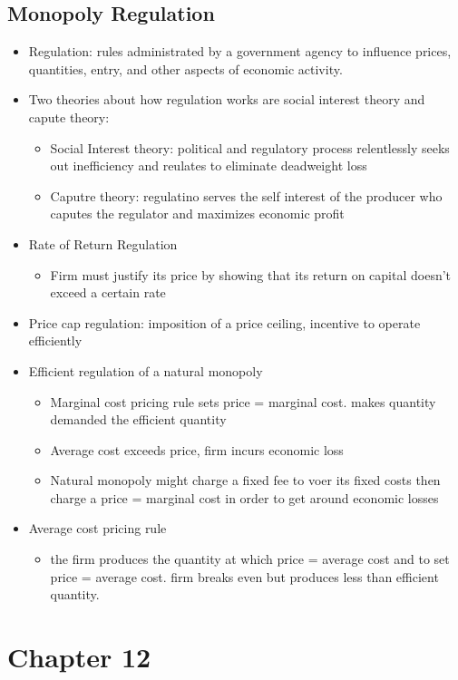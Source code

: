\documentclass[11pt]{article}
\begin{document}
\subsection{Monopoly Regulation}
\label{sec:org59a8524}
\begin{itemize}
\item Regulation: rules administrated by a government agency to influence prices, quantities, entry, and other aspects of economic activity.
\item Two theories about how regulation works are social interest theory and capute theory:
\begin{itemize}
\item Social Interest theory: political and regulatory process relentlessly seeks out inefficiency and reulates to eliminate deadweight loss
\item Caputre theory: regulatino serves the self interest of the producer who caputes the regulator and maximizes economic profit
\end{itemize}
\item Rate of Return Regulation
\begin{itemize}
\item Firm must justify its price by showing that its return on capital doesn't exceed a certain rate
\end{itemize}
\item Price cap regulation: imposition of a price ceiling, incentive to operate efficiently
\item Efficient regulation of a natural monopoly
\begin{itemize}
\item Marginal cost pricing rule sets price = marginal cost.
makes quantity demanded the efficient quantity
\item Average cost exceeds price, firm incurs economic loss
\item Natural monopoly might charge a fixed fee to voer its fixed costs then charge a price = marginal cost in order to get around economic losses
\end{itemize}
\item Average cost pricing rule
\begin{itemize}
\item the firm produces the quantity at which price = average cost and to set price = average cost. firm breaks even but produces less than efficient quantity.
\end{itemize}
\end{itemize}
\section{Chapter 12}
\label{sec:orge6d402e}
\end{document}
